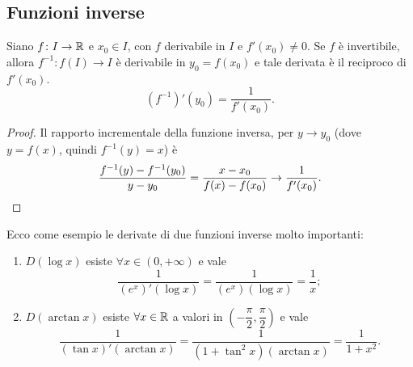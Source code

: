 \subsection{Funzioni inverse}
\begin{teorema}
Siano $f\colon I\to\mathbb{R}$ e $x_0\in I$, con $f$ derivabile in $I$ e $f'(x_0)\neq 0$. Se $f$ è invertibile, allora $f^{-1}\colon f(I)\to I$ è derivabile in $y_0=f(x_0)$ e tale derivata è il reciproco di $f'(x_0)$.
\begin{equation}
(f^{-1})'(y_0)=\frac1{f'(x_0)}.
\end{equation}
\end{teorema}
\begin{proof}
Il rapporto incrementale della funzione inversa, per $y\to y_0$ (dove $y=f(x)$, quindi $f^{-1}(y)=x$) è
\[
\frac{f^{-1}(y)-f^{-1}(y_0)}{y-y_0}=\frac{x-x_0}{f(x)-f(x_0)}\to\frac1{f'(x_0)}.\qedhere
\]
\end{proof}
\begin{esempio} \label{es:derivata-funzione-inversa}
	Ecco come esempio le derivate di due funzioni inverse molto importanti:
	\begin{enumerate}
		\item $D(\log x)$ esiste $\forall x\in (0,+\infty)$ e vale
		\[
		\frac1{(e^x)'(\log x)}=\frac1{(e^x)(\log x)}=\frac1{x};
		\]
		\item $D(\arctan x)$ esiste $\forall x\in\mathbb{R}$ a valori in $\left(-\dfrac{\pi}2,\dfrac{\pi}2\right)$ e vale
		\[
		\frac1{(\tan x)'(\arctan x)}=\frac1{(1+\tan^2x)(\arctan x)}=\frac1{1+x^2}.
		\]
	\end{enumerate}
\end{esempio}

